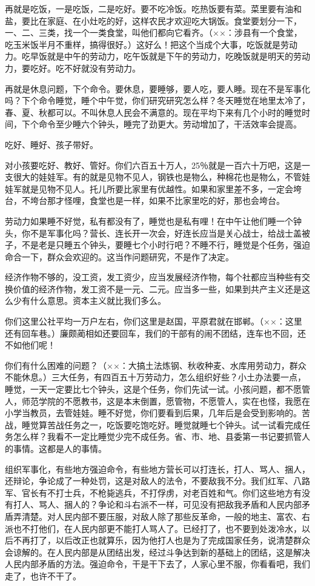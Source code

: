 再就是吃饭，一是吃饭，二是吃好。要不吃冷饭。吃热饭要有菜。菜里要有油和盐，要比在家庭、在小灶吃的好，这样农民才欢迎吃大锅饭。食堂要划分一下，一、二、三类，找一个一类食堂，叫他们都向它看齐。（××：涉县有一个食堂，吃玉米饭半月不重样，搞得很好。）这好么！把这个当成个大事，吃饭就是劳动力。吃早饭就是中午的劳动力，吃午饭就是下午的劳动力，吃晚饭就是明天的劳动力，要吃好。吃不好就没有劳动力。

再就是休息问题，下个命令。要休息，要睡够，要人吃，要人睡。现在不是军事化吗？下个命令睡觉，睡个中午觉，你们研究研究怎么样？冬天睡觉在地里太冷了，春、夏、秋都可以。不叫休息人民会不满意的。现在平均下来有几个小时的睡觉时间，下个命令至少睡六个钟头，睡完了劲更大。劳动增加了，干活效率会提高。

吃好、睡好、孩子带好。

对小孩要吃好、教好、管好。你们六百五十万人，25％就是一百六十万吧，这是一支很大的娃娃军。有的就是见物不见人，钢铁也是物么，种棉花也是物么，不管娃娃军就是见物不见人。托儿所要比家里有优越性。如果和家里差不多，一定会垮台，不垮台那才怪哩，食堂也是一样，如果不比家里吃的好，那也会垮台。

劳动力如果睡不好觉，私有都没有了，睡觉也是私有哩！在中午让他们睡一个钟头，你不是军事化吗？营长、连长开一次会，好连长应当是关心战士，给战士盖被子，不是老是只睡五个钟头，要睡七个小时行吧？不睡不行，睡觉是个任务，强迫命合一下，群众会欢迎的。这当作问题研究，不是作了决定。

经济作物不够的，没工资，发工资少，应当发展经济作物，每个社都应当种些有交换价值的经济作物，发工资不是一元、二元。应当多一些，如果到共产主义还是这么少有什么意思。资本主义就比我们多么。

你们这里公社平均一万户左右，你们这里是赵国，平原君就在邯郸。（××：这里还有回车巷。）廉颇蔺相如还要回车，我们的干部有的闹不团结，连车也不回，还不如他们呢！

你们有什么困难的问题？（××：大搞土法炼钢、秋收种麦、水库用劳动力，群众不能休息。）三大任务，有四百五十万劳动力，怎么组织好些？小土办法要一点，睡觉，一天一定要比七个钟头，这是个任务，你们先试一试。小孩问题，都不愿管人，师范学院的不愿教书，这是本末倒置，愿管物，不愿管人，实在也怪，我愿在小学当教员，去管娃娃。睡不好觉，你们要看到后果，几年后是会受到影响的。苦战，睡觉算苦战任务之一，吃饭要吃饱吃好。睡觉就睡七个钟头。试一试看完成任务怎么样？我看不一定比睡觉少完不成任务。省、市、地、县委第一书记要抓管人的事情。这都是人的事情。

组织军事化，有些地方强迫命令，有些地方营长可以打连长，打人、骂人、捆人，还辩论，争论成了一种处罚，这是对敌人的法令，不要敌我不分。我们红军、八路军、官长有不打士兵，不枪毙逃兵，不打俘虏，对老百姓和气。你们这些地方有没有打人、骂人、捆人的？争论和斗右派不一样，可见没有把敌我矛盾和人民内部矛盾弄清楚。对人民内部不要压服，对敌人除了那些反革命，一般的地主、富农、右派也不打他们，在人民内部更不能打人骂人了。已经打了，也不要到处泼冷水，以后不再打了，以后改正也就算乐，因为他打人也是为了完成国家任务，说清楚群众会谅解的。在人民内部是从团结出发，经过斗争达到新的基础上的团结，这是解决人民内部矛盾的方法。强迫命令，干是干下去了，人家心里不服，你看看吧，我们走了，也许不干了。


